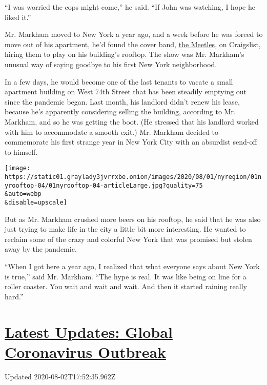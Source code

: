 ``I was worried the cops might come,'' he said. ``If John was watching,
I hope he liked it.''

Mr. Markham moved to New York a year ago, and a week before he was
forced to move out of his apartment, he'd found the cover band,
\href{http://www.meetles.com/}{the Meetles}, on Craigslist, hiring them
to play on his building's rooftop. The show was Mr. Markham's unusual
way of saying goodbye to his first New York neighborhood.

In a few days, he would become one of the last tenants to vacate a small
apartment building on West 74th Street that has been steadily emptying
out since the pandemic began. Last month, his landlord didn't renew his
lease, because he's apparently considering selling the building,
according to Mr. Markham, and so he was getting the boot. (He stressed
that his landlord worked with him to accommodate a smooth exit.) Mr.
Markham decided to commemorate his first strange year in New York City
with an absurdist send-off to himself.

\texttt{[image: https://static01.graylady3jvrrxbe.onion/images/2020/08/01/nyregion/01nyrooftop-04/01nyrooftop-04-articleLarge.jpg?quality=75\\\&auto=webp\\\&disable=upscale]}

But as Mr. Markham crushed more beers on his rooftop, he said that he
was also just trying to make life in the city a little bit more
interesting. He wanted to reclaim some of the crazy and colorful New
York that was promised but stolen away by the pandemic.

``When I got here a year ago, I realized that what everyone says about
New York is true,'' said Mr. Markham. ``The hype is real. It was like
being on line for a roller coaster. You wait and wait and wait. And then
it started raining really hard.''

\hypertarget{latest-updates-global-coronavirus-outbreak}{%
\section{\texorpdfstring{\href{https://www.nytimes3xbfgragh.onion/2020/08/01/world/coronavirus-covid-19.html?action=click\&pgtype=Article\&state=default\&region=MAIN_CONTENT_1\&context=storylines_live_updates}{Latest
Updates: Global Coronavirus
Outbreak}}{Latest Updates: Global Coronavirus Outbreak}}\label{latest-updates-global-coronavirus-outbreak}}

Updated 2020-08-02T17:52:35.962Z

